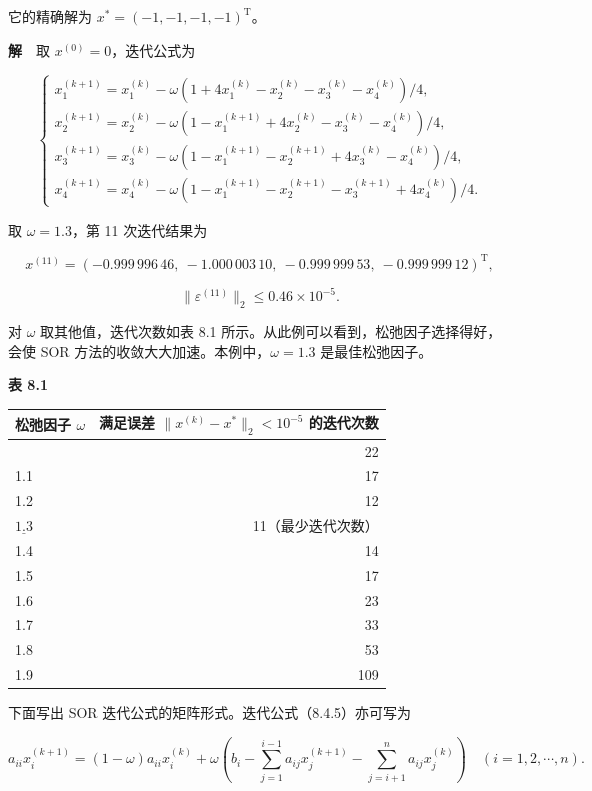 它的精确解为 \(x^*=(-1,-1,-1,-1)^{\mathrm T}\)。

\textbf{解}　取 \(x^{(0)}=0\)，迭代公式为

\[
\begin{cases}
x_1^{(k+1)}=x_1^{(k)}-\omega(1+4x_1^{(k)}-x_2^{(k)}-x_3^{(k)}-x_4^{(k)})/4,\\
x_2^{(k+1)}=x_2^{(k)}-\omega(1-x_1^{(k+1)}+4x_2^{(k)}-x_3^{(k)}-x_4^{(k)})/4,\\
x_3^{(k+1)}=x_3^{(k)}-\omega(1-x_1^{(k+1)}-x_2^{(k+1)}+4x_3^{(k)}-x_4^{(k)})/4,\\
x_4^{(k+1)}=x_4^{(k)}-\omega(1-x_1^{(k+1)}-x_2^{(k+1)}-x_3^{(k+1)}+4x_4^{(k)})/4.
\end{cases}
\]

取 \(\omega=1.3\)，第 11 次迭代结果为

\[
x^{(11)}=(-0.999\,996\,46,\ -1.000\,003\,10,\ -0.999\,999\,53,\ -0.999\,999\,12)^{\mathrm T},
\]

\[
\|\varepsilon^{(11)}\|_2\leqslant0.46\times10^{-5}.
\]

对 \(\omega\) 取其他值，迭代次数如表 8.1 所示。从此例可以看到，松弛因子选择得好，会使 SOR 方法的收敛大大加速。本例中，\(\omega=1.3\) 是最佳松弛因子。


\textbf{表 8.1}

{\def\LTcaptype{none} %
\begin{longtable}[]{@{}lr@{}}
\toprule\noalign{}
松弛因子 \(\omega\) & 满足误差 \(\|x^{(k)}-x^*\|_2<10^{-5}\) 的迭代次数 \\
\midrule\noalign{}
\endhead
\bottomrule\noalign{}
\endlastfoot
1.0 & 22 \\
1.1 & 17 \\
1.2 & 12 \\
\(\underline{1.3}\) & 11（最少迭代次数） \\
1.4 & 14 \\
1.5 & 17 \\
1.6 & 23 \\
1.7 & 33 \\
1.8 & 53 \\
1.9 & 109 \\
\end{longtable}
}

下面写出 SOR 迭代公式的矩阵形式。迭代公式（8.4.5）亦可写为

\[
a_{ii}x_i^{(k+1)}=(1-\omega)a_{ii}x_i^{(k)}+\omega\left(b_i-\sum_{j=1}^{i-1}a_{ij}x_j^{(k+1)}-\sum_{j=i+1}^n a_{ij}x_j^{(k)}\right)\quad(i=1,2,\cdots,n).
\tag{8.4.7}
\]


